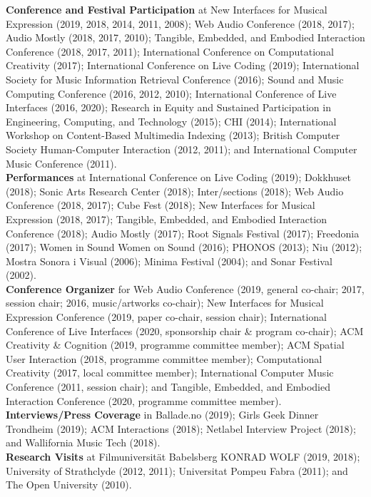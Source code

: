 \documentclass[10pt, a4paper]{article}
\begin{document}
{\textbf{Conference and Festival Participation}} at New Interfaces for Musical Expression (2019, 2018, 2014, 2011, 2008); Web Audio Conference (2018, 2017); Audio Mostly (2018, 2017, 2010); Tangible, Embedded, and Embodied Interaction Conference (2018, 2017, 2011); International Conference on Computational Creativity (2017); International Conference on Live Coding (2019); International Society for Music Information Retrieval Conference (2016); Sound and Music Computing Conference (2016, 2012, 2010); International Conference of Live Interfaces (2016, 2020); Research in Equity and Sustained Participation in Engineering, Computing, and Technology (2015); CHI (2014); International Workshop on Content-Based Multimedia Indexing (2013); British Computer Society Human-Computer Interaction (2012, 2011); and International Computer Music Conference (2011).\\

{\textbf{Performances}} at International Conference on Live Coding (2019); Dokkhuset (2018); Sonic Arts Research Center (2018); Inter/sections (2018); Web Audio Conference (2018, 2017); Cube Fest (2018); New Interfaces for Musical Expression (2018, 2017); Tangible, Embedded, and Embodied Interaction Conference (2018); Audio Mostly (2017); Root Signals Festival (2017); Freedonia (2017); Women in Sound Women on Sound (2016); PHONOS (2013); Niu (2012); Mostra Sonora i Visual (2006); Minima Festival (2004); and Sonar Festival (2002).\\

{\textbf{Conference Organizer}} for Web Audio Conference (2019, general co-chair; 2017, session chair; 2016, music/artworks co-chair); New Interfaces for Musical Expression Conference (2019, paper co-chair, session chair); International Conference of Live Interfaces (2020, sponsorship chair \& program co-chair); ACM Creativity \& Cognition (2019, programme committee member); ACM Spatial User Interaction (2018, programme committee member); Computational Creativity (2017, local committee member); International Computer Music Conference (2011, session chair); and Tangible, Embedded, and Embodied Interaction Conference (2020, programme committee member).\\

{\textbf{Interviews/Press Coverage}} in Ballade.no (2019); Girls Geek Dinner Trondheim (2019); ACM Interactions (2018); Netlabel Interview Project (2018); and Wallifornia Music Tech (2018).\\

{\textbf{Research Visits}} at Filmuniversität Babelsberg KONRAD WOLF (2019, 2018); University of Strathclyde (2012, 2011); Universitat Pompeu Fabra (2011); and The Open University (2010).\\
\end{document}
